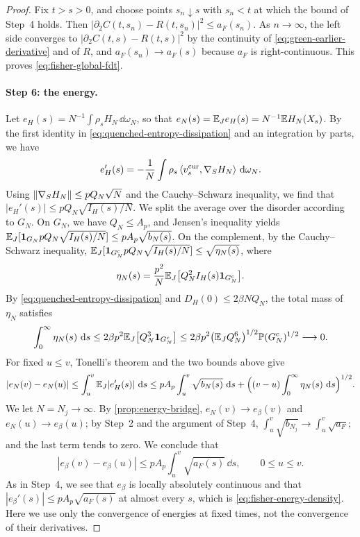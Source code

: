 \begin{proof}
Fix $t>s>0$, and choose points $s_n\downarrow s$ with $s_n<t$ at which the bound of Step~4 holds. Then $|\partial_2C(t,s_n)-R(t,s_n)|^2\le a_F(s_n)$. As $n\to\infty$, the left side converges to $|\partial_2C(t,s)-R(t,s)|^2$ by the continuity of \eqref{eq:green-earlier-derivative} and of $R$, and $a_F(s_n)\to a_F(s)$ because $a_F$ is right-continuous. This proves \eqref{eq:fisher-global-fdt}.

\paragraph{Step 6: the energy.}
Let $e_H(s)=N^{-1}\int\rho_sH_N\,\dd\omega_N$, so that $e_N(s)=\mathbb E_Je_H(s)=N^{-1}\mathbb E H_N(X_s)$. By the first identity in \eqref{eq:quenched-entropy-dissipation} and an integration by parts, we have
\[
 e_H'(s)=-\frac1N\int\rho_s\left\langle v^{\mathrm{cur}}_s,\nabla_SH_N\right\rangle\,\mathop{}\!\mathrm d\omega_N.
\]
Using $\lVert\nabla_SH_N\rVert\le pQ_N\sqrt N$ and the Cauchy--Schwarz inequality, we find that $|e_H'(s)|\le pQ_N\sqrt{I_H(s)/N}$. We split the average over the disorder according to $G_N$. On $G_N$, we have $Q_N\le A_p$, and Jensen's inequality yields $\mathbb E_J[\mathbf 1_{G_N}pQ_N\sqrt{I_H(s)/N}]\le pA_p\sqrt{b_N(s)}$. On the complement, by the Cauchy--Schwarz inequality, $\mathbb E_J[\mathbf 1_{G_N^c}pQ_N\sqrt{I_H(s)/N}]\le\sqrt{\eta_N(s)}$, where
\[
 \eta_N(s)=\frac{p^2}{N}\mathbb E_J\bigl[Q_N^2I_H(s)\mathbf 1_{G_N^c}\bigr].
\]
By \eqref{eq:quenched-entropy-dissipation} and $D_H(0)\le2\beta NQ_N$, the total mass of $\eta_N$ satisfies
\[
 \int_0^\infty\eta_N(s)\,\mathop{}\!\mathrm d s\le2\beta p^2\mathbb E_J\bigl[Q_N^3\mathbf 1_{G_N^c}\bigr]
 \le2\beta p^2\bigl(\mathbb E_JQ_N^6\bigr)^{1/2}\mathbb P(G_N^c)^{1/2}\longrightarrow0.
\]
For fixed $u\le v$, Tonelli's theorem and the two bounds above give
\[
 |e_N(v)-e_N(u)|\le\int_u^v\mathbb E_J|e_H'(s)|\,\mathop{}\!\mathrm d s
 \le pA_p\int_u^v\sqrt{b_N(s)}\,\mathop{}\!\mathrm d s+\Bigl((v-u)\int_0^\infty\eta_N(s)\,\mathop{}\!\mathrm d s\Bigr)^{1/2}.
\]
We let $N=N_j\to\infty$. By \cref{prop:energy-bridge}, $e_N(v)\to e_\beta(v)$ and $e_N(u)\to e_\beta(u)$; by Step~2 and the argument of Step~4, $\int_u^v\sqrt{b_{N_j}}\to\int_u^v\sqrt{a_F}$; and the last term tends to zero. We conclude that
\[
 |e_\beta(v)-e_\beta(u)|\le pA_p\int_u^v\sqrt{a_F(s)}\,\dd s,\qquad 0\le u\le v.
\]
As in Step~4, we see that $e_\beta$ is locally absolutely continuous and that $|e_\beta'(s)|\le pA_p\sqrt{a_F(s)}$ at almost every $s$, which is \eqref{eq:fisher-energy-density}. Here we use only the convergence of energies at fixed times, not the convergence of their derivatives.
\end{proof}

